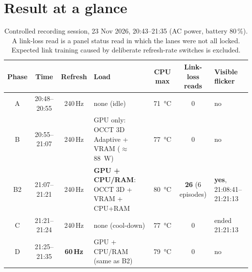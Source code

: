 \documentclass[11pt,a4paper]{article}
\begin{document}
\section{Result at a glance}
\begin{table}[H]
\centering
\caption{Controlled recording session, 23 Nov 2026, 20:43--21:35 (AC power, battery 80\,\%). A link-loss read is a panel status read
in which the lanes were not all locked. Expected link training caused by deliberate refresh-rate switches is excluded.}
\label{tab:phases}
\small
\begin{tabularx}{\linewidth}{@{}c c c Y c c >{\raggedright\arraybackslash}p{2.3cm}@{}}
\toprule
Phase & Time & Refresh & Load & CPU max & Link-loss reads & Visible flicker\\
\midrule
A & 20:48--20:55 & 240\,Hz & none (idle) & \SI{71}{\celsius} & \textcolor{good}{0} & no\\
B & 20:55--21:07 & 240\,Hz & GPU only: OCCT 3D Adaptive + VRAM ($\approx$\SI{88}{W}) & \SI{77}{\celsius} & \textcolor{good}{0} & no\\
B2 & 21:07--21:21 & 240\,Hz & \textbf{GPU + CPU/RAM}: OCCT 3D + VRAM + CPU+RAM & \SI{80}{\celsius} & \textcolor{bad}{\textbf{26} (6 episodes)} & \textbf{yes}, 21:08:41--21:21:13\\
C & 21:21--21:24 & 240\,Hz & none (cool-down) & \SI{77}{\celsius} & \textcolor{good}{0} & ended 21:21:13\\
D & 21:25--21:35 & \textbf{60\,Hz} & GPU + CPU/RAM (same as B2) & \SI{79}{\celsius} & \textcolor{good}{0} & no\\
\bottomrule
\end{tabularx}
\end{table}
\end{document}
